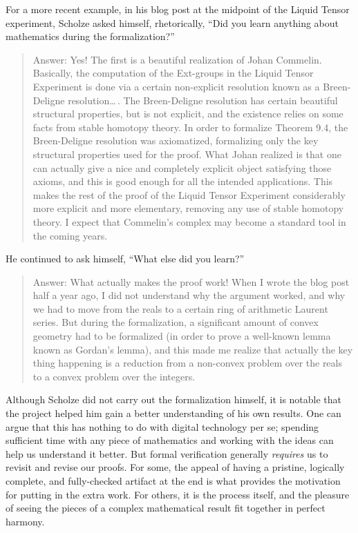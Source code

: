 \documentclass{amsart}
\theoremstyle{definition}
\theoremstyle{remark}
\numberwithin{equation}{section}
\begin{document}
For a more recent example, in his blog post at the midpoint of the Liquid Tensor experiment, Scholze asked himself, rhetorically, ``Did you learn anything about mathematics during the formalization?''
\begin{quote}
  Answer: Yes! The first is a beautiful realization of Johan Commelin. Basically, the computation of the Ext-groups in the Liquid Tensor Experiment is done via a certain non-explicit resolution known as a Breen-Deligne resolution\ldots\,. The Breen-Deligne resolution has certain beautiful structural properties, but is not explicit, and the existence relies on some facts from stable homotopy theory. In order to formalize Theorem 9.4, the Breen-Deligne resolution was axiomatized, formalizing only the key structural properties used for the proof. What Johan realized is that one can actually give a nice and completely explicit object satisfying those axioms, and this is good enough for all the intended applications. This makes the rest of the proof of the Liquid Tensor Experiment considerably more explicit and more elementary, removing any use of stable homotopy theory. I expect that Commelin’s complex may become a standard tool in the coming years.
\end{quote}
He continued to ask himself, ``What else did you learn?''
\begin{quote}
  Answer: What actually makes the proof work! When I wrote the blog post half a year ago, I did not understand why the argument worked, and why we had to move from the reals to a certain ring of arithmetic Laurent series. But during the formalization, a significant amount of convex geometry had to be formalized (in order to prove a well-known lemma known as Gordan’s lemma), and this made me realize that actually the key thing happening is a reduction from a non-convex problem over the reals to a convex problem over the integers.
\end{quote}
Although Scholze did not carry out the formalization himself, it is notable that the project helped him gain a better understanding of his own results. One can argue that this has nothing to do with digital technology per se; spending sufficient time with any piece of mathematics and working with the ideas can help us understand it better. But formal verification generally \emph{requires} us to revisit and revise our proofs. For some,  the appeal of having a pristine, logically complete, and fully-checked artifact at the end is what provides the motivation for putting in the extra work. For others, it is the process itself, and the pleasure of seeing the pieces of a complex mathematical result fit together in perfect harmony.
\end{document}
